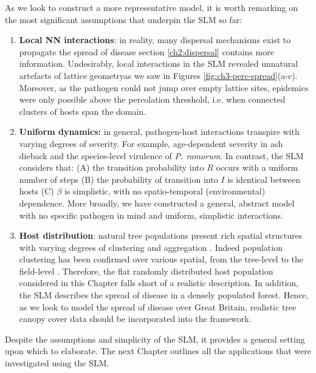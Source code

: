 As we look to construct a more representative model, it is worth remarking on the most significant assumptions that underpin the SLM so far:
\begin{enumerate}
    \item \textbf{Local NN interactions}: in reality, many dispersal mechanisms exist to propagate the spread of disease\textemdash 
    section \ref{ch2:dispersal} contains more information. 
    Undesirably, local interactions in the SLM revealed unnatural artefacts of lattice geometry\textemdash as we saw in Figures \ref{fig:ch3-perc-spread}(a-c).
    Moreover, as the pathogen could not jump over empty lattice sites, epidemics were only possible above the percolation threshold, 
    i.e. when connected clusters of hosts span the domain.  
    
    \item \textbf{Uniform dynamics:} in general, pathogen-host interactions transpire with varying degrees of severity.
    For example, age-dependent severity in ash dieback and the species-level virulence of \textit{P. ramorum}. 
    In contrast, the SLM considers that: (A) the transition probability into $R$ occurs with a uniform number of steps 
    (B) the probability of transition into $I$ is identical between hosts 
    (C) $\beta$ is simplistic, with no spatio-temporal (environmental) dependence. 
    More broadly, we have constructed a general, abstract model with no specific pathogen in mind and uniform, simplistic interactions.
    
    \item \textbf{Host distribution}: natural tree populations present rich spatial structures with varying degrees of clustering and aggregation \cite{doi:10.1086/342823}.
    Indeed population clustering has been confirmed over various spatial, from the tree-level to the field-level \cite{wiegand2007analyzing}.
    Therefore, the flat randomly distributed host population considered in this Chapter falls short of a realistic description.
    In addition, the SLM describes the spread of disease in a densely populated forest.
    Hence, as we look to model the spread of disease over Great Britain, realistic tree canopy cover data should be incorporated into the framework.
\end{enumerate}
Despite the assumptions and simplicity of the SLM, it provides a general setting upon which to elaborate.
The next Chapter outlines all the applications that were investigated using the SLM.
\newpage